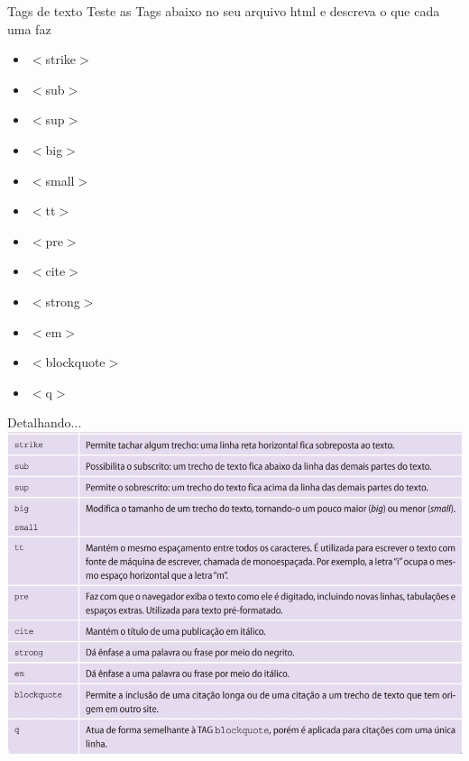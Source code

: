 \documentclass{beamer}
\begin{document}
\begin{frame}{Tags de texto}
 Teste as Tags abaixo no seu arquivo html e descreva o que cada uma faz
\begin{itemize}
 \item $<$strike$>$
  \item $<$sub$>$
  \item $<$sup$>$
  \item $<$big$>$
  \item $<$small$>$
  \item $<$tt$>$
  \item $<$pre$>$
  \item $<$cite$>$
  \item $<$strong$>$
  \item $<$em$>$
  \item $<$blockquote$>$
  \item $<$q$>$
\end{itemize}
\end{frame}
\begin{frame}{Detalhando...}
 \includegraphics[height=0.7\paperheight]{fig/aula1/tagFormata.png} \\
\end{frame}

\end{document}
